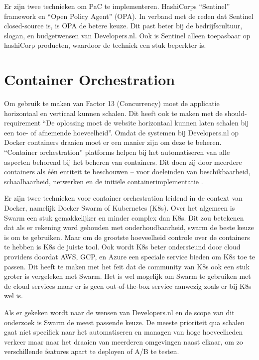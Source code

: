 Er zijn twee technieken om PaC te implementeren. HashiCorps \enquote{Sentinel} framework en \enquote{Open Policy Agent} (OPA). In verband met de reden dat Sentinel closed-source is, is OPA de betere keuze. Dit past beter bij de bedrijfscultuur, slogan, en budgetwensen van Developers.nl. Ook is Sentinel alleen toepasbaar op hashiCorp producten, waardoor de techniek een stuk beperkter is.

\section{Container Orchestration}
\label{ContainerOrchestration}
Om gebruik te maken van Factor 13 (Concurrency) moet de applicatie horizontaal en verticaal kunnen schalen. Dit heeft ook te maken met de should-requirement \enquote{De oplossing moet de website horizontaal kunnen laten schalen bij een toe- of afnemende hoeveelheid}. Omdat de systemen bij Developers.nl op Docker containers draaien moet er een manier zijn om deze te beheren. \enquote{Container orchestration} platforms helpen bij het automatiseren van alle aspecten behorend bij het beheren van containers. Dit doen zij door meerdere containers als één entiteit te beschouwen -- voor doeleinden van beschikbaarheid, schaalbaarheid, netwerken en de initiële containerimplementatie \parencite{ContainerOrchestration}.

Er zijn twee technieken voor container orchestration leidend in de context van Docker, namelijk Docker Swarm of Kubernetes (K8s). Over het algemeen is Swarm een stuk gemakkelijker en minder complex dan K8s. Dit zou betekenen dat als er rekening word gehouden met onderhoudbaarheid, swarm de beste keuze is om te gebruiken. Maar om de grootste hoeveelheid controle over de containers te hebben is K8s de juiste tool. Ook wordt K8s beter ondersteund door cloud providers doordat AWS, GCP, en Azure een speciale service bieden om K8s toe te passen. Dit heeft te maken met het feit dat de community van K8s ook een stuk groter is vergeleken met Swarm. Het is wel mogelijk om Swarm te gebruiken met de cloud services maar er is geen out-of-the-box service aanwezig zoals er bij K8s wel is. 

Als er gekeken wordt naar de wensen van Developers.nl en de scope van dit onderzoek is Swarm de meest passende keuze. De meeste prioriteit qua schalen gaat niet specifiek naar het automatiseren en managen van hoge hoeveelheden verkeer maar naar het draaien van meerderen omgevingen naast elkaar, om zo verschillende features apart te deployen of A/B te testen.

